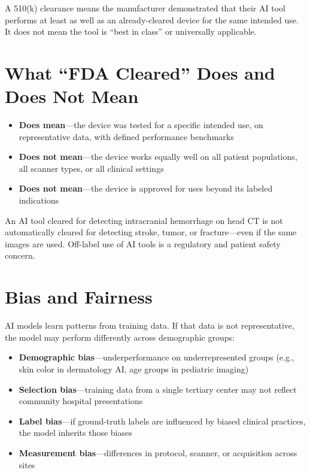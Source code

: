 A 510(k) clearance means the manufacturer demonstrated that their AI tool performs at least as well as an already-cleared device for the same intended use. It does not mean the tool is ``best in class'' or universally applicable.

\section{What ``FDA Cleared'' Does and Does Not Mean}
\begin{itemize}
    \item \textbf{Does mean}---the device was tested for a specific intended use, on representative data, with defined performance benchmarks
    \item \textbf{Does not mean}---the device works equally well on all patient populations, all scanner types, or all clinical settings
    \item \textbf{Does not mean}---the device is approved for uses beyond its labeled indications
\end{itemize}

\begin{pearlbox}
An AI tool cleared for detecting intracranial hemorrhage on head CT is not automatically cleared for detecting stroke, tumor, or fracture---even if the same images are used. Off-label use of AI tools is a regulatory and patient safety concern.
\end{pearlbox}

\section{Bias and Fairness}
AI models learn patterns from training data. If that data is not representative, the model may perform differently across demographic groups:

\begin{itemize}
    \item \textbf{Demographic bias}---underperformance on underrepresented groups (e.g., skin color in dermatology AI, age groups in pediatric imaging)
    \item \textbf{Selection bias}---training data from a single tertiary center may not reflect community hospital presentations
    \item \textbf{Label bias}---if ground-truth labels are influenced by biased clinical practices, the model inherits those biases
    \item \textbf{Measurement bias}---differences in protocol, scanner, or acquisition across sites
\end{itemize}

